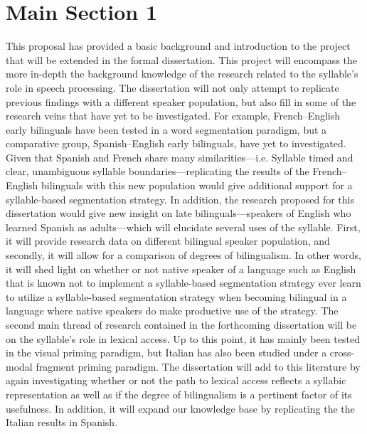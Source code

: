 \documentclass[
12pt, %
english, %
doublespacing, %
nolistspacing, %
liststotoc, %
headsepline, %
chapterinoneline, %
openany, %
]{DoctoralThesis}\usepackage[]{graphicx}\usepackage[]{color}
\begin{document}
\section{Main Section 1}

This proposal has provided a basic background and introduction to the project that will be extended in the formal dissertation. This project will encompass the more in-depth the background knowledge of the research related to the syllable’s role in speech processing. The dissertation will not only attempt to replicate previous findings with a different speaker population, but also fill in some of the research veins that have yet to be investigated. For example, French–English early bilinguals have been tested in a word segmentation paradigm, but a comparative group, Spanish–English early bilinguals, have yet to investigated. Given that Spanish and French share many similarities—i.e. Syllable timed and clear, unambiguous syllable boundaries—replicating the results of the French–English bilinguals with this new population would give additional support for a syllable-based segmentation strategy. In addition, the research proposed for this dissertation would give new insight on late bilinguals—speakers of English who learned Spanish as adults—which will elucidate several uses of the syllable. First, it will provide research data on different bilingual speaker population, and secondly, it will allow for a comparison of degrees of bilingualism. In other words, it will shed light on whether or not native speaker of a language such as English that is known not to implement a syllable-based segmentation strategy ever learn to utilize a syllable-based segmentation strategy when becoming bilingual in a language where native speakers do make productive use of the strategy.
The second main thread of research contained in the forthcoming dissertation will be on the syllable’s role in lexical access. Up to this point, it has mainly been tested in the visual priming paradigm, but Italian has also been studied under a cross-modal fragment priming paradigm. The dissertation will add to this literature by again investigating whether or not the path to lexical access reflects a syllabic representation as well as if the degree of bilingualism is a pertinent factor of its usefulness. In addition, it will expand our knowledge base by replicating the the Italian results in Spanish. 
\end{document}
